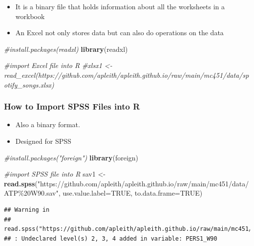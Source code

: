 \documentclass[
  b5paper]{book}
\newenvironment{Shaded}{\begin{snugshade}}{\end{snugshade}}
\newcommand{\AttributeTok}[1]{\textcolor[rgb]{0.13,0.29,0.53}{#1}}
\newcommand{\CommentTok}[1]{\textcolor[rgb]{0.56,0.35,0.01}{\textit{#1}}}
\newcommand{\ConstantTok}[1]{\textcolor[rgb]{0.56,0.35,0.01}{#1}}
\newcommand{\FunctionTok}[1]{\textcolor[rgb]{0.13,0.29,0.53}{\textbf{#1}}}
\newcommand{\NormalTok}[1]{#1}
\newcommand{\OtherTok}[1]{\textcolor[rgb]{0.56,0.35,0.01}{#1}}
\newcommand{\StringTok}[1]{\textcolor[rgb]{0.31,0.60,0.02}{#1}}
\providecommand{\tightlist}{%
  \setlength{\itemsep}{0pt}\setlength{\parskip}{0pt}}
\begin{document}
\begin{itemize}
\tightlist
\item
  It is a binary file that holds information about all the worksheets in a workbook
\item
  An Excel not only stores data but can also do operations on the data
\end{itemize}

\begin{Shaded}
\begin{Highlighting}[]
\CommentTok{\#install.packages(\textquotesingle{}readxl\textquotesingle{})}
\FunctionTok{library}\NormalTok{(readxl)}

\CommentTok{\#import Excel file into R}
\CommentTok{\#xlsx1 \textless{}{-} read\_excel(\textquotesingle{}https://github.com/apleith/apleith.github.io/raw/main/mc451/data/spotify\_songs.xlsx\textquotesingle{})}
\end{Highlighting}
\end{Shaded}

\hypertarget{how-to-import-spss-files-into-r}{%
\subsubsection*{How to Import SPSS Files into R}\label{how-to-import-spss-files-into-r}}

\begin{itemize}
\tightlist
\item
  Also a binary format.
\item
  Designed for SPSS
\end{itemize}

\begin{Shaded}
\begin{Highlighting}[]
\CommentTok{\#install.packages("foreign")}
\FunctionTok{library}\NormalTok{(foreign)}

\CommentTok{\#import SPSS file into R}
\NormalTok{sav1 }\OtherTok{\textless{}{-}} \FunctionTok{read.spss}\NormalTok{(}\StringTok{"https://github.com/apleith/apleith.github.io/raw/main/mc451/data/ATP\%20W90.sav"}\NormalTok{, }\AttributeTok{use.value.label=}\ConstantTok{TRUE}\NormalTok{, }\AttributeTok{to.data.frame=}\ConstantTok{TRUE}\NormalTok{)}
\end{Highlighting}
\end{Shaded}

\begin{verbatim}
## Warning in
## read.spss("https://github.com/apleith/apleith.github.io/raw/main/mc451/data/ATP%20W90.sav",
## : Undeclared level(s) 2, 3, 4 added in variable: PERS1_W90
\end{verbatim}
\end{document}
